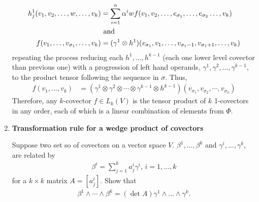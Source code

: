 \documentclass[10pt,a4paper]{report}
\begin{document}
\begin{enumerate}[label=3.\arabic*.]
{\begin{itemize}
\begin{align*}
		h^1_j(v_1, v_2, \dots,w, \dots, v_k) &= 
		\sum_{i=1}^n \alpha^i{w}f(v_1, v_2, \dots, e_{\sigma_1}, \dots, e_{\sigma_2} \dots, v_k) \\
		&\text{ and } \\
		f(v_1, \dots, v_{\sigma_1},\dots, v_k) &= (\gamma^1 \otimes h^1)(v_{\sigma_1},v_1, \dots, v_{\sigma_1-1},v_{\sigma_1+1}, \dots, v_k)
	\end{align*}repeating the process reducing each  $h^1, \dots, h^{k-1}$ (each one lower level covector than previous one) with a progression of left hand operands, $\gamma^1, \gamma^2, \dots, \gamma^{k-1}$, to the product tensor following the sequence in $\sigma$.  Thus, 
	\begin{align*}
		f(v_1, \dots, v_k) &= (\gamma^1\otimes \gamma^2 \otimes \cdots \otimes \gamma^{k-1} \otimes h^{k-1})(v_{\sigma_1}, v_{\sigma_2}, \cdots, v_{\sigma_k})
	\end{align*}Therefore, any $k$-covector $f \in L_k(V)$ is the tensor product of $k$ 1-covectors in any order, each of which is a linear combination of elements from $\Phi$.
	\end{itemize}
	}
\newpage		
	\setcounter{enumi}{6}
	\item \textbf{Transformation rule for a wedge product of covectors}
		
		Suppose two set so of covectors on a vector space $V$.  $\beta^1,\dots, \beta^k$ and $\gamma^i,\dots,\gamma^k$, are related by 
		\begin{align*}
			\beta^i=\sum_{j=1}^k a^i_j\gamma^i, \, i=1,\dots,k
		\end{align*}for a $k \times k$ matrix $A=[a_j^i]$.  Show that
		\begin{align*}
			\beta^1 \wedge\cdots\wedge \beta^k = (\det A)\gamma^1\wedge\dots\wedge\gamma^k.
		\end{align*}
		

\end{enumerate}
\end{document}
